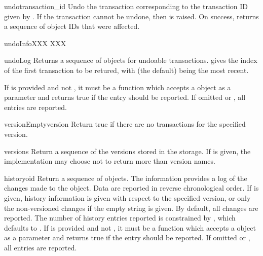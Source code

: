 \documentclass{howto}
\begin{document}
\begin{methoddesc}{undo}{transaction_id}
   Undo the transaction corresponding to the transaction ID given by
   .  If the transaction cannot be undone, then
    is raised.  On success, returns a sequence of
   object IDs that were affected.
\end{methoddesc}

\begin{methoddesc}{undoInfo}{XXX}
  XXX
\end{methoddesc}

\begin{methoddesc}{undoLog}{}
  Returns a sequence of  objects for
  undoable transactions.   gives the index of the first
  transaction to be retured, with  (the default) being the
  most recent.


  If  is provided and not , it must be a
  function which accepts a  object as a
  parameter and returns true if the entry should be reported.  If
  omitted or , all entries are reported.
\end{methoddesc}

\begin{methoddesc}{versionEmpty}{version}
  Return true if there are no transactions for the specified version.
\end{methoddesc}

\begin{methoddesc}{versions}{}
  Return a sequence of the versions stored in the storage.  If
   is given, the implementation may choose not to return more
  than  version names.
\end{methoddesc}

\begin{methoddesc}{history}{oid}
  Return a sequence of  objects.  The information
  provides a log of the changes made to the object.  Data are reported
  in reverse chronological order.  If  is given, history
  information is given with respect to the specified version, or only
  the non-versioned changes if the empty string is given.  By default,
  all changes are reported.  The number of history entries reported is
  constrained by , which defaults to .  If
   is provided and not , it must be a function
  which accepts a  object as a parameter and
  returns true if the entry should be reported.  If omitted or
  , all entries are reported.
\end{methoddesc}
\end{document}
